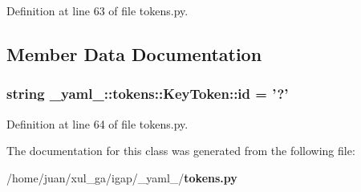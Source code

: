 Definition at line 63 of file tokens.py.

\subsection{Member Data Documentation}
\subsubsection{\setlength{\rightskip}{0pt plus 5cm}string {\bf \_\-yaml\_\-::tokens::KeyToken::id} = '?'\hspace{0.3cm}{\tt  [static]}}\label{class__yaml___1_1tokens_1_1KeyToken_9244012f60579bdf6b2c64a37c55d610}




Definition at line 64 of file tokens.py.

The documentation for this class was generated from the following file:\begin{CompactItemize}
\item 
/home/juan/xul\_\-ga/igap/\_\-yaml\_\-/{\bf tokens.py}\end{CompactItemize}
